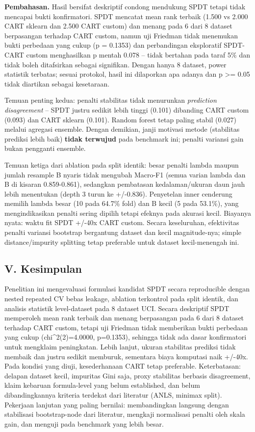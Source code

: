 \documentclass[
  conference]{IEEEtran}
\begin{document}
\textbf{Pembahasan.} Hasil bersifat deskriptif condong mendukung SPDT
tetapi tidak mencapai bukti konfirmatori. SPDT mencatat mean rank
terbaik (1.500 vs 2.000 CART sklearn dan 2.500 CART custom) dan menang
pada 6 dari 8 dataset berpasangan terhadap CART custom, namun uji
Friedman tidak menemukan bukti perbedaan yang cukup (p = 0.1353) dan
perbandingan eksploratif SPDT-CART custom menghasilkan p mentah 0.078 --
tidak bertahan pada taraf 5\% dan tidak boleh ditafsirkan sebagai
signifikan. Dengan hanya 8 dataset, power statistik terbatas; sesuai
protokol, hasil ini dilaporkan apa adanya dan p \textgreater= 0.05 tidak
diartikan sebagai kesetaraan.

Temuan penting kedua: penalti stabilitas tidak menurunkan
\emph{prediction disagreement} -- SPDT justru sedikit lebih tinggi
(0.101) dibanding CART custom (0.093) dan CART sklearn (0.101). Random
forest tetap paling stabil (0.027) melalui agregasi ensemble. Dengan
demikian, janji motivasi metode (stabilitas prediksi lebih baik)
\textbf{tidak terwujud} pada benchmark ini; penalti variansi gain bukan
pengganti ensemble.

Temuan ketiga dari ablation pada split identik: besar penalti lambda
maupun jumlah resample B nyaris tidak mengubah Macro-F1 (semua varian
lambda dan B di kisaran 0.859-0.861), sedangkan pembatasan
kedalaman/ukuran daun jauh lebih menentukan (depth 3 turun ke +/-0.836).
Penyetelan inner cenderung memilih lambda besar (10 pada 64.7\% fold)
dan B kecil (5 pada 53.1\%), yang mengindikasikan penalti sering dipilih
tetapi efeknya pada akurasi kecil. Biayanya nyata: waktu fit SPDT +/-40x
CART custom. Secara keseluruhan, efektivitas penalti variansi bootstrap
bergantung dataset dan kecil magnitude-nya; simple distance/impurity
splitting tetap preferable untuk dataset kecil-menengah ini.

\subsection{V. Kesimpulan}\label{v.-kesimpulan}

Penelitian ini mengevaluasi formulasi kandidat SPDT secara reproducible
dengan nested repeated CV bebas leakage, ablation terkontrol pada split
identik, dan analisis statistik level-dataset pada 8 dataset UCI. Secara
deskriptif SPDT memperoleh mean rank terbaik dan menang berpasangan pada
6 dari 8 dataset terhadap CART custom, tetapi uji Friedman tidak
memberikan bukti perbedaan yang cukup (chi\^{}2(2)=4.0000, p=0.1353),
sehingga tidak ada dasar konfirmatori untuk mengklaim peningkatan. Lebih
lanjut, ukuran stabilitas prediksi tidak membaik dan justru sedikit
memburuk, sementara biaya komputasi naik +/-40x. Pada kondisi yang
diuji, kesederhanaan CART tetap preferable. Keterbatasan: delapan
dataset kecil, impuritas Gini saja, proxy stabilitas berbasis
disagreement, klaim kebaruan formula-level yang belum established, dan
belum dibandingkannya kriteria terdekat dari literatur (ANLS, minimax
split). Pekerjaan lanjutan yang paling bernilai: membandingkan langsung
dengan stabilisasi bootstrap-node dari literatur, mengkaji normalisasi
penalti oleh skala gain, dan menguji pada benchmark yang lebih besar.
\end{document}

